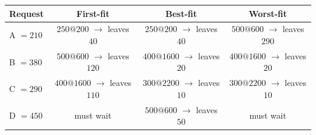 \begin{tabular}{@{}lccc@{}}
\toprule
\textbf{Request} & \textbf{First-fit} & \textbf{Best-fit} & \textbf{Worst-fit}\\
\midrule
A $= 210$ & $250@200$ $\to$ leaves $40$ & $250@200$ $\to$ leaves $40$ & $500@600$ $\to$ leaves $290$\\
B $= 380$ & $500@600$ $\to$ leaves $120$ & $400@1600$ $\to$ leaves $20$ & $400@1600$ $\to$ leaves $20$\\
C $= 290$ & $400@1600$ $\to$ leaves $110$ & $300@2200$ $\to$ leaves $10$ & $300@2200$ $\to$ leaves $10$\\
D $= 450$ & \textcolor{red!60!black}{must wait} & $500@600$ $\to$ leaves $50$ & \textcolor{red!60!black}{must wait}\\
\bottomrule
\end{tabular}
